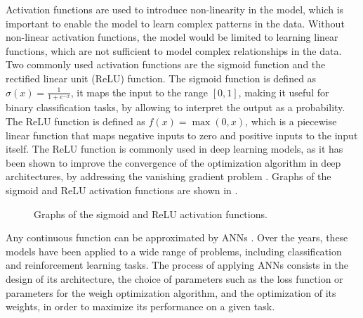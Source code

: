 Activation functions \cite{activation} are used to introduce non-linearity in the model, which is important to enable the model to learn complex patterns in the data. Without
non-linear activation functions, the model would be limited to learning linear functions, which are not sufficient to model complex relationships in the data.
Two commonly used activation functions are the sigmoid function and the rectified linear unit (ReLU) function. The sigmoid function is defined as
$\sigma(x) = \frac{1}{1 + e^{-x}}$, it maps the input to the range $[0, 1]$, making it useful for binary classification tasks, by allowing to interpret the output as a probability.
The ReLU function is defined as $f(x) = \max(0, x)$, which is a piecewise linear function that maps negative inputs to zero and positive inputs to the input itself. The ReLU
function is commonly used in deep learning models, as it has been shown to improve the convergence of the optimization algorithm in deep architectures, by addressing the
vanishing gradient problem \cite{relu}. Graphs of the sigmoid and ReLU activation functions are shown in .

\begin{figure}
    \begin{center}
        \caption{Graphs of the sigmoid and ReLU activation functions.}
        \label{fig:activation_functions}
    \end{center}
\end{figure}

Any continuous function can be approximated by ANNs \cite{approximation}. Over the years, these models have been applied to a wide range of problems, including classification and reinforcement
learning tasks. The process of applying ANNs consists in the design of its architecture, the choice of parameters such as the loss function or parameters for the
weigh optimization algorithm, and the optimization of its weights, in order to maximize its performance on a given task.

